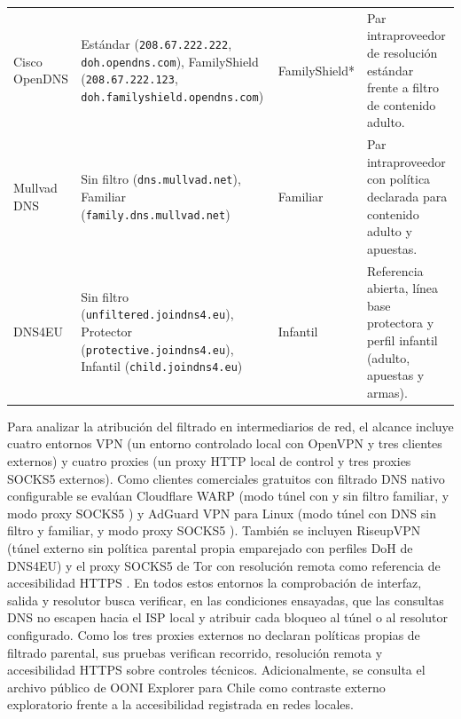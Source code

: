 \documentclass[10pt,a4paper]{article}
\begin{document}
\begin{table}[H]
\begin{tabularx}{\textwidth}{>{\raggedright\arraybackslash}p{2.05cm}>{\raggedright\arraybackslash}p{5.85cm}>{\raggedright\arraybackslash}p{1.80cm}Y}
Cisco OpenDNS \cite{opendnssetup} & Estándar (\texttt{208.67.222.222}, \texttt{doh.opendns.com}), FamilyShield (\texttt{208.67.222.123}, \texttt{doh.familyshield.opendns.com}) & FamilyShield* & Par intraproveedor de resolución estándar frente a filtro de contenido adulto.\\
Mullvad DNS \cite{mullvaddns} & Sin filtro (\texttt{dns.mullvad.net}), Familiar (\texttt{family.dns.mullvad.net}) & Familiar & Par intraproveedor con política declarada para contenido adulto y apuestas.\\
DNS4EU \cite{dns4euperfiles,dns4eupolitica} & Sin filtro (\texttt{unfiltered.joindns4.eu}), Protector (\texttt{protective.joindns4.eu}), Infantil (\texttt{child.joindns4.eu}) & Infantil & Referencia abierta, línea base protectora y perfil infantil (adulto, apuestas y armas).\\
\bottomrule
\end{tabularx}
\end{table}

Para analizar la atribución del filtrado en intermediarios de red, el alcance incluye cuatro entornos VPN (un entorno controlado local con OpenVPN \cite{openvpnmanual} y tres clientes externos) y cuatro proxies (un proxy HTTP local de control y tres proxies SOCKS5 externos). Como clientes comerciales gratuitos con filtrado DNS nativo configurable se evalúan Cloudflare WARP (modo túnel con y sin filtro familiar, y modo proxy SOCKS5 \cite{warpcliente,warpmodos}) y AdGuard VPN para Linux (modo túnel con DNS sin filtro y familiar, y modo proxy SOCKS5 \cite{adguardvpnlinux}). También se incluyen RiseupVPN \cite{riseupvpn} (túnel externo sin política parental propia emparejado con perfiles DoH de DNS4EU) y el proxy SOCKS5 de Tor con resolución remota como referencia de accesibilidad HTTPS \cite{torprotocol}. En todos estos entornos la comprobación de interfaz, salida y resolutor busca verificar, en las condiciones ensayadas, que las consultas DNS no escapen hacia el ISP local y atribuir cada bloqueo al túnel o al resolutor configurado. Como los tres proxies externos no declaran políticas propias de filtrado parental, sus pruebas verifican recorrido, resolución remota y accesibilidad HTTPS sobre controles técnicos. Adicionalmente, se consulta el archivo público de OONI Explorer para Chile \cite{ooni2012,ooni} como contraste externo exploratorio frente a la accesibilidad registrada en redes locales.
\end{document}

